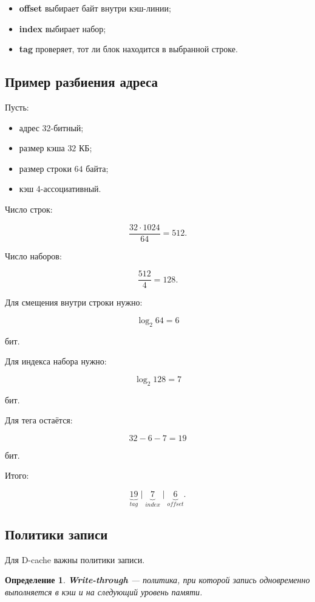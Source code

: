 \documentclass[12pt,a4paper]{article}
\newtheorem{definition}{Определение}
\begin{document}
\begin{itemize}
    \item \textbf{offset} выбирает байт внутри кэш-линии;
    \item \textbf{index} выбирает набор;
    \item \textbf{tag} проверяет, тот ли блок находится в выбранной строке.
\end{itemize}

\subsection{Пример разбиения адреса}

Пусть:

\begin{itemize}
    \item адрес 32-битный;
    \item размер кэша $32$ КБ;
    \item размер строки $64$ байта;
    \item кэш 4-ассоциативный.
\end{itemize}

Число строк:

\[
    \frac{32 \cdot 1024}{64} = 512.
\]

Число наборов:

\[
    \frac{512}{4} = 128.
\]

Для смещения внутри строки нужно:

\[
    \log_2 64 = 6
\]

бит.

Для индекса набора нужно:

\[
    \log_2 128 = 7
\]

бит.

Для тега остаётся:

\[
    32 - 6 - 7 = 19
\]

бит.

Итого:

\[
    \underbrace{19}_{tag}
    \mid
    \underbrace{7}_{index}
    \mid
    \underbrace{6}_{offset}.
\]

\subsection{Политики записи}

Для D-cache важны политики записи.

\begin{definition}
\textbf{Write-through} --- политика, при которой запись одновременно выполняется в кэш и на следующий уровень памяти.
\end{definition}
\end{document}
